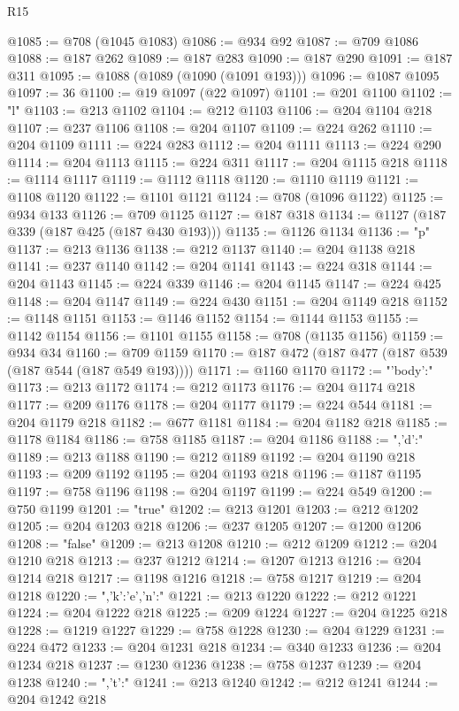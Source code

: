 \begin{lexlean}{R15}
\begin{coremodule}
{{@1085 := @708 (@1045 @1083)
@1086 := @934 @92
@1087 := @709 @1086
@1088 := @187 @262
@1089 := @187 @283
@1090 := @187 @290
@1091 := @187 @311
@1095 := @1088 (@1089 (@1090 (@1091 @193)))
@1096 := @1087 @1095
@1097 := 36
@1100 := @19 @1097 (@22 @1097)
@1101 := @201 @1100
@1102 := "l"
@1103 := @213 @1102
@1104 := @212 @1103
@1106 := @204 @1104 @218
@1107 := @237 @1106
@1108 := @204 @1107
@1109 := @224 @262
@1110 := @204 @1109
@1111 := @224 @283
@1112 := @204 @1111
@1113 := @224 @290
@1114 := @204 @1113
@1115 := @224 @311
@1117 := @204 @1115 @218
@1118 := @1114 @1117
@1119 := @1112 @1118
@1120 := @1110 @1119
@1121 := @1108 @1120
@1122 := @1101 @1121
@1124 := @708 (@1096 @1122)
@1125 := @934 @133
@1126 := @709 @1125
@1127 := @187 @318
@1134 := @1127 (@187 @339 (@187 @425 (@187 @430 @193)))
@1135 := @1126 @1134
@1136 := "p"
@1137 := @213 @1136
@1138 := @212 @1137
@1140 := @204 @1138 @218
@1141 := @237 @1140
@1142 := @204 @1141
@1143 := @224 @318
@1144 := @204 @1143
@1145 := @224 @339
@1146 := @204 @1145
@1147 := @224 @425
@1148 := @204 @1147
@1149 := @224 @430
@1151 := @204 @1149 @218
@1152 := @1148 @1151
@1153 := @1146 @1152
@1154 := @1144 @1153
@1155 := @1142 @1154
@1156 := @1101 @1155
@1158 := @708 (@1135 @1156)
@1159 := @934 @34
@1160 := @709 @1159
@1170 := @187 @472 (@187 @477 (@187 @539 (@187 @544 (@187 @549 @193))))
@1171 := @1160 @1170
@1172 := "{'body':"
@1173 := @213 @1172
@1174 := @212 @1173
@1176 := @204 @1174 @218
@1177 := @209 @1176
@1178 := @204 @1177
@1179 := @224 @544
@1181 := @204 @1179 @218
@1182 := @677 @1181
@1184 := @204 @1182 @218
@1185 := @1178 @1184
@1186 := @758 @1185
@1187 := @204 @1186
@1188 := ",'d':"
@1189 := @213 @1188
@1190 := @212 @1189
@1192 := @204 @1190 @218
@1193 := @209 @1192
@1195 := @204 @1193 @218
@1196 := @1187 @1195
@1197 := @758 @1196
@1198 := @204 @1197
@1199 := @224 @549
@1200 := @750 @1199
@1201 := "true"
@1202 := @213 @1201
@1203 := @212 @1202
@1205 := @204 @1203 @218
@1206 := @237 @1205
@1207 := @1200 @1206
@1208 := "false"
@1209 := @213 @1208
@1210 := @212 @1209
@1212 := @204 @1210 @218
@1213 := @237 @1212
@1214 := @1207 @1213
@1216 := @204 @1214 @218
@1217 := @1198 @1216
@1218 := @758 @1217
@1219 := @204 @1218
@1220 := ",'k':'e','n':"
@1221 := @213 @1220
@1222 := @212 @1221
@1224 := @204 @1222 @218
@1225 := @209 @1224
@1227 := @204 @1225 @218
@1228 := @1219 @1227
@1229 := @758 @1228
@1230 := @204 @1229
@1231 := @224 @472
@1233 := @204 @1231 @218
@1234 := @340 @1233
@1236 := @204 @1234 @218
@1237 := @1230 @1236
@1238 := @758 @1237
@1239 := @204 @1238
@1240 := ",'t':"
@1241 := @213 @1240
@1242 := @212 @1241
@1244 := @204 @1242 @218
}}}
\end{coremodule}
\end{lexlean}
